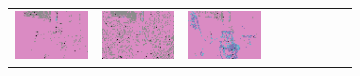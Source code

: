 \documentclass{ipol}
\begin{document}
\begin{figure}[ht]
\begin{subfigure}[t]{\linewidth}
\begin{tabular}{ccccccccc}
                \includegraphics[width=\s]{images/carnival/LINEAR/bid_j100_64_grids.png}&
                \includegraphics[width=\s]{images/carnival/PPG/bid_j100_64_grids.png}&
                \includegraphics[width=\s]{images/carnival/VNG/bid_j100_64_grids.png}\\

\end{tabular}
\end{subfigure}
\end{figure}
\end{document}

